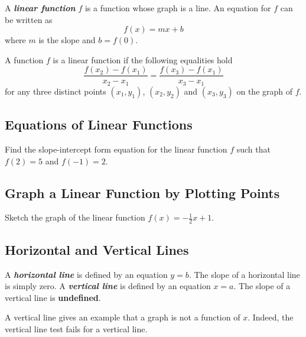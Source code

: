 A \textbf{\emph{linear function}} \(f\) is a function whose graph is a
line. An equation for \(f\) can be written as \[f(x) = mx + b\] where
\(m\) is the slope and \(b=f(0)\).

A function \(f\) is a linear function if the following equalities hold
\[
\dfrac{f(x_2)-f(x_1)}{x_2-x_1}
=\dfrac{f(x_3)-f(x_1)}{x_3-x_1}
\] for any three distinct points \((x_1, y_1)\), \((x_2, y_2)\) and
\((x_3, y_3)\) on the graph of \(f\).

\hypertarget{equations-of-linear-functions}{%
\subsection{Equations of Linear
Functions}\label{equations-of-linear-functions}}

\begin{example}

Find the slope-intercept form equation for the linear function \(f\)
such that \(f(2)=5\) and \(f(-1) = 2\).

\end{example}
\vspace*{6\baselineskip}

\hypertarget{graph-a-linear-function-by-plotting-points}{%
\subsection{Graph a Linear Function by Plotting
Points}\label{graph-a-linear-function-by-plotting-points}}

\begin{example}

Sketch the graph of the linear function \(f(x)=-\frac12 x + 1\).

\end{example}
\vspace*{6\baselineskip}

\hypertarget{horizontal-and-vertical-lines}{%
\subsection{Horizontal and Vertical
Lines}\label{horizontal-and-vertical-lines}}

A \textbf{\emph{horizontal line}} is defined by an equation \(y=b\). The
slope of a horizontal line is simply zero. A \textbf{\emph{vertical
line}} is defined by an equation \(x=a\). The slope of a vertical line
is \textbf{undefined}.

A vertical line gives an example that a graph is not a function of
\(x\). Indeed, the vertical line test fails for a vertical line.

